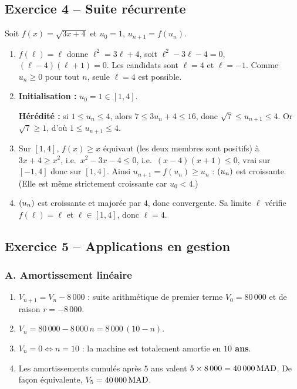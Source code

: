 \documentclass[11pt,a4paper]{article}
\begin{document}
\subsection{Exercice 4 -- Suite récurrente}

Soit $f(x)=\sqrt{3x+4}$ et $u_0=1$, $u_{n+1}=f(u_n)$.

\begin{enumerate}
  \item $f(\ell)=\ell$ donne $\ell^2=3\ell+4$, soit $\ell^2-3\ell-4=0$, $(\ell-4)(\ell+1)=0$. Les candidats sont $\ell=4$ et $\ell=-1$. Comme $u_n\geq 0$ pour tout $n$, seule $\ell=4$ est possible.

  \item \textbf{Initialisation :} $u_0=1\in[1,4]$.

  \textbf{Hérédité :} si $1\leq u_n\leq 4$, alors $7\leq 3u_n+4\leq 16$, donc $\sqrt{7}\leq u_{n+1}\leq 4$. Or $\sqrt{7}\geq 1$, d'où $1\leq u_{n+1}\leq 4$.

  \item Sur $[1,4]$, $f(x)\geq x$ équivaut (les deux membres sont positifs) à $3x+4\geq x^2$, i.e.\ $x^2-3x-4\leq 0$, i.e.\ $(x-4)(x+1)\leq 0$, vrai sur $[-1,4]$ donc sur $[1,4]$. Ainsi $u_{n+1}=f(u_n)\geq u_n$ : $(u_n)$ est croissante. (Elle est même strictement croissante car $u_0<4$.)

  \item $(u_n)$ est croissante et majorée par $4$, donc convergente. Sa limite $\ell$ vérifie $f(\ell)=\ell$ et $\ell\in[1,4]$, donc $\ell=4$.
\end{enumerate}

\subsection{Exercice 5 -- Applications en gestion}

\subsubsection*{A. Amortissement linéaire}

\begin{enumerate}
  \item $V_{n+1}=V_n-8\,000$ : suite arithmétique de premier terme $V_0=80\,000$ et de raison $r=-8\,000$.
  \item $V_n = 80\,000 - 8\,000\, n = 8\,000\,(10-n)$.
  \item $V_n=0 \iff n=10$ : la machine est totalement amortie en \textbf{$10$ ans}.
  \item Les amortissements cumulés après $5$ ans valent $5\times 8\,000 = 40\,000\,\mathrm{MAD}$. De façon équivalente, $V_5=40\,000\,\mathrm{MAD}$.
\end{enumerate}
\end{document}
